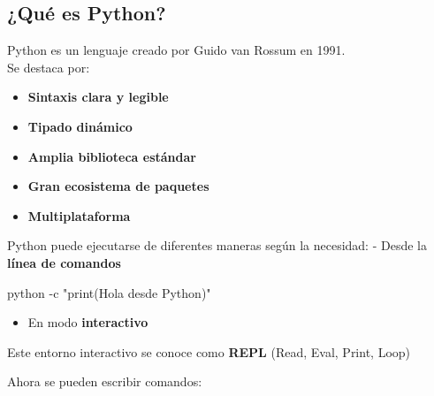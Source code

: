 \documentclass[
]{book}
\newenvironment{Shaded}{\begin{snugshade}}{\end{snugshade}}
\newcommand{\AttributeTok}[1]{\textcolor[rgb]{0.13,0.29,0.53}{#1}}
\newcommand{\ErrorTok}[1]{\textcolor[rgb]{0.64,0.00,0.00}{\textbf{#1}}}
\newcommand{\ExtensionTok}[1]{#1}
\newcommand{\KeywordTok}[1]{\textcolor[rgb]{0.13,0.29,0.53}{\textbf{#1}}}
\newcommand{\NormalTok}[1]{#1}
\newcommand{\OperatorTok}[1]{\textcolor[rgb]{0.81,0.36,0.00}{\textbf{#1}}}
\newcommand{\StringTok}[1]{\textcolor[rgb]{0.31,0.60,0.02}{#1}}
\providecommand{\tightlist}{%
  \setlength{\itemsep}{0pt}\setlength{\parskip}{0pt}}
\theoremstyle{break}
\theoremstyle{nonumberplain}
\begin{document}
\subsection{¿Qué es Python?}\label{quuxe9-es-python}

Python es un lenguaje creado por Guido van Rossum en 1991.\\
Se destaca por:

\begin{itemize}
\tightlist
\item
  \textbf{Sintaxis clara y legible}
\item
  \textbf{Tipado dinámico}
\item
  \textbf{Amplia biblioteca estándar}
\item
  \textbf{Gran ecosistema de paquetes}
\item
  \textbf{Multiplataforma}
\end{itemize}

Python puede ejecutarse de diferentes maneras según la necesidad:
- Desde la \textbf{línea de comandos}

\begin{Shaded}
\begin{Highlighting}[]
\ExtensionTok{python} \AttributeTok{{-}c} \StringTok{"print(\textquotesingle{}Hola desde Python\textquotesingle{})"}
\end{Highlighting}
\end{Shaded}

\begin{itemize}
\tightlist
\item
  En modo \textbf{interactivo}
\end{itemize}

Este entorno interactivo se conoce como \textbf{REPL} (Read, Eval, Print, Loop)

\begin{Shaded}
\end{Shaded}

Ahora se pueden escribir comandos:
\end{document}
